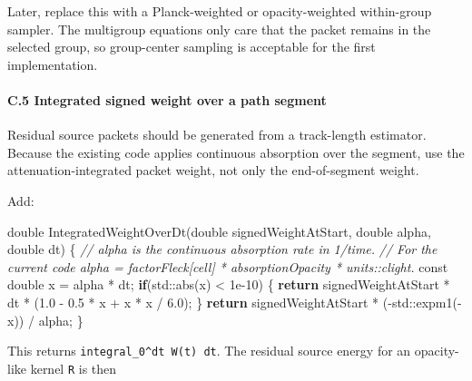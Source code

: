 \documentclass[
]{article}
\newenvironment{Shaded}{}{}
\newcommand{\AttributeTok}[1]{\textcolor[rgb]{0.49,0.56,0.16}{#1}}
\newcommand{\BuiltInTok}[1]{\textcolor[rgb]{0.00,0.50,0.00}{#1}}
\newcommand{\CommentTok}[1]{\textcolor[rgb]{0.38,0.63,0.69}{\textit{#1}}}
\newcommand{\ControlFlowTok}[1]{\textcolor[rgb]{0.00,0.44,0.13}{\textbf{#1}}}
\newcommand{\DataTypeTok}[1]{\textcolor[rgb]{0.56,0.13,0.00}{#1}}
\newcommand{\FloatTok}[1]{\textcolor[rgb]{0.25,0.63,0.44}{#1}}
\newcommand{\NormalTok}[1]{#1}
\newcommand{\OperatorTok}[1]{\textcolor[rgb]{0.40,0.40,0.40}{#1}}
\begin{document}
Later, replace this with a Planck-weighted or opacity-weighted
within-group sampler. The multigroup equations only care that the packet
remains in the selected group, so group-center sampling is acceptable
for the first implementation.

\paragraph{C.5 Integrated signed weight over a path
segment}\label{c.5-integrated-signed-weight-over-a-path-segment}

Residual source packets should be generated from a track-length
estimator. Because the existing code applies continuous absorption over
the segment, use the attenuation-integrated packet weight, not only the
end-of-segment weight.

Add:

\begin{Shaded}
\begin{Highlighting}[]
\DataTypeTok{double}\NormalTok{ IntegratedWeightOverDt}\OperatorTok{(}\DataTypeTok{double}\NormalTok{ signedWeightAtStart}\OperatorTok{,} \DataTypeTok{double}\NormalTok{ alpha}\OperatorTok{,} \DataTypeTok{double}\NormalTok{ dt}\OperatorTok{)}
\OperatorTok{\{}
    \CommentTok{// alpha is the continuous absorption rate in 1/time.}
    \CommentTok{// For the current code alpha = factorFleck[cell] * absorptionOpacity * units::clight.}
    \AttributeTok{const} \DataTypeTok{double}\NormalTok{ x }\OperatorTok{=}\NormalTok{ alpha }\OperatorTok{*}\NormalTok{ dt}\OperatorTok{;}
    \ControlFlowTok{if}\OperatorTok{(}\BuiltInTok{std::}\NormalTok{abs}\OperatorTok{(}\NormalTok{x}\OperatorTok{)} \OperatorTok{\textless{}} \FloatTok{1e{-}10}\OperatorTok{)}
    \OperatorTok{\{}
        \ControlFlowTok{return}\NormalTok{ signedWeightAtStart }\OperatorTok{*}\NormalTok{ dt }\OperatorTok{*} \OperatorTok{(}\FloatTok{1.0} \OperatorTok{{-}} \FloatTok{0.5} \OperatorTok{*}\NormalTok{ x }\OperatorTok{+}\NormalTok{ x }\OperatorTok{*}\NormalTok{ x }\OperatorTok{/} \FloatTok{6.0}\OperatorTok{);}
    \OperatorTok{\}}
    \ControlFlowTok{return}\NormalTok{ signedWeightAtStart }\OperatorTok{*} \OperatorTok{({-}}\BuiltInTok{std::}\NormalTok{expm1}\OperatorTok{({-}}\NormalTok{x}\OperatorTok{))} \OperatorTok{/}\NormalTok{ alpha}\OperatorTok{;}
\OperatorTok{\}}
\end{Highlighting}
\end{Shaded}

This returns \texttt{integral\_0\^{}dt\ W(t)\ dt}. The residual source
energy for an opacity-like kernel \texttt{R} is then
\end{document}
